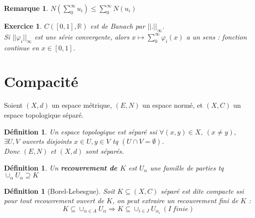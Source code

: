 \documentclass[a4paper, oneside]{report}
\theoremstyle{break}
\newtheorem{defi}[thm]{Définition}
\newtheorem{remar}[thm]{Remarque}
\newtheorem{exo}[thm]{Exercice}
\newcommand{\R}{\mathbb{R}}
\newcommand{\etop}{espace topologique }
\begin{document}
\begin{remar}
$N(\sum_{0}^\infty u_i) \leq \sum_{0}^\infty N(u_i)$
\end{remar}


\begin{exo}
$C([0,1], \R)$ est de Banach par $||.||_\infty$.\\
Si $||\varphi_i||_\infty$ est une série convergente, alors $x\mapsto \sum_{0}^\infty \varphi_i(x)$ a un sens : fonction continue en $x\in [0,1]$.
\end{exo}


\section{Compacité}

Soient $(X,d)$ un espace métrique, $(E,N)$ un espace normé, et $(X,C)$ un espace topologique séparé.\\

\begin{defi}                    
Un \etop est séparé ssi $\forall (x,y)\in X,~(x\neq y),$ $\exists U,V$ ouverts disjoints $x\in U, y\in V$ tq $(U\cap V = \emptyset)$.\\
Donc $(E,N)$ et $(X,d)$ sont séparés.
\end{defi}

\begin{defi}
Un \textbf{recouvrement de $K$} est $U_\alpha$ une famille de parties tq $\cup_\alpha U_\alpha \supseteq K$
\end{defi}


\begin{defi}[Borel-Lebesgue]
Soit $K\subseteq (X,C)$ séparé est dite compacte ssi pour tout recouvrement ouvert de $K$, on peut extraire un recouvrement fini de $K$ :
$$K\subseteq \cup_{\alpha \in A}U_\alpha \Rightarrow K\subseteq \cup_{i\in J}U_{\alpha_i}~(I~finie)$$
\end{defi}
\end{document}
